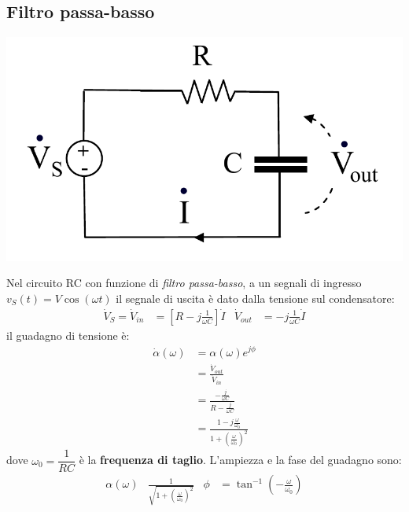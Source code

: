 \documentclass{article}
\begin{document}
\subsection{Filtro passa-basso}
\begin{center}
    \includegraphics[scale=0.3]{Image/Passa-basso_1.png}
\end{center}
Nel circuito RC con funzione di \textit{filtro passa-basso}, a un segnali di ingresso $v_S(t)=V \cos(\omega t)$ il segnale di uscita è dato dalla tensione sul condensatore:
\begin{align*}
    \dot V_S = \dot V_{in} &= \left[R - j \frac{1}{\omega C}\right]\dot I & \dot V_{out} &= -j \frac{1}{\omega C} \dot I
\end{align*}
il guadagno di tensione è:
\begin{align*}
    \dot \alpha(\omega) &= \alpha(\omega) e^{j \phi}
    \\
    &=\frac{\dot V_{out}}{\dot V_{in}}
    \\
    &= \frac{-\frac{j}{\omega C}}{R -\frac{j}{\omega C}}
    \\
    &= \frac{1-j \frac{\omega}{\omega_0}}{1 + \left(\frac{\omega}{\omega_0}\right)^2}
\end{align*}
dove $\omega_0=\dfrac{1}{RC}$ è la \textbf{frequenza di taglio}. L'ampiezza e la fase del guadagno sono:
\begin{align*}
    \alpha(\omega) & \frac{1}{\sqrt{1+\left(\frac{\omega}{\omega_0}\right)^2}} & \phi &= \tan^{-1}\left(- \frac{\omega}{\omega_0}\right)
\end{align*}
\end{document}

